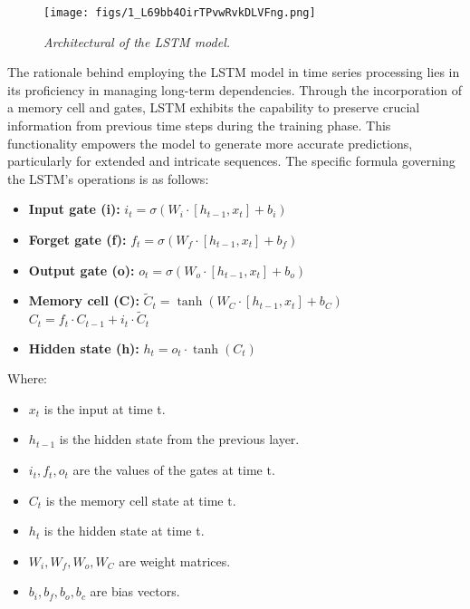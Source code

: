 \documentclass{ieeeojies}
\begin{document}
\begin{figure}[H]
    \centering
    \texttt{[image: figs/1\_L69bb4OirTPvwRvkDLVFng.png]}
    \caption{\centering \textit{Architectural of the LSTM model.}}
    \label{fig:enter-label}
\end{figure}

The rationale behind employing the LSTM model in time series processing lies in its proficiency in managing long-term dependencies. Through the incorporation of a memory cell and gates, LSTM exhibits the capability to preserve crucial information from previous time steps during the training phase. This functionality empowers the model to generate more accurate predictions, particularly for extended and intricate sequences. The specific formula governing the LSTM's operations is as follows\cite{article7}:
\begin{itemize}
    \item \textbf{Input gate (i):} $i_t=\sigma\left(W_i \cdot\left[h_{t-1}, x_t\right]+b_i\right)$\\
    \item \textbf{Forget gate (f):} $f_t=\sigma\left(W_f \cdot\left[h_{t-1}, x_t\right]+b_f\right)$\\
    \item \textbf{Output gate (o):} $o_t=\sigma\left(W_o \cdot\left[h_{t-1}, x_t\right]+b_o\right)$\\
    \item \textbf{Memory cell (C):} $\tilde{C}_t=\tanh \left(W_C \cdot\left[h_{t-1}, x_t\right]+b_C\right)$
     $C_t=f_t \cdot C_{t-1}+i_t \cdot \tilde{C}_t$
    \item \textbf{Hidden state (h):} $h_t=o_t \cdot \tanh \left(C_t\right)$
\end{itemize}

Where:
\begin{itemize}
    \item $x_t$ is the input at time t.
    \item $h_{t-1}$ is the hidden state from the previous layer.
    \item $i_t, f_t, o_t$ are the values of the gates at time $\mathrm{t}$.
    \item $C_t$ is the memory cell state at time $\mathrm{t}$.
    \item $h_t$ is the hidden state at time t.
    \item $W_i, W_f, W_o, W_C$ are weight matrices.
    \item $b_i, b_f, b_o, b_c$ are bias vectors.
\end{itemize}
\end{document}
